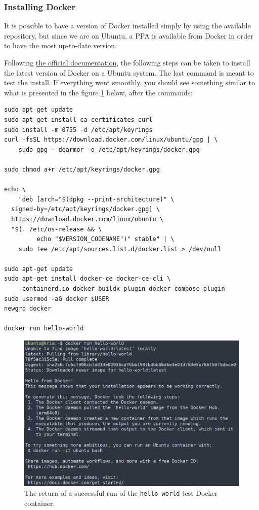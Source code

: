 \documentclass[10pt]{article}
\begin{document}
\subsubsection{Installing Docker}
\label{sec:org33d85de}
It is possible to have a version of Docker installed simply by using the available repository,
but since we are on Ubuntu, a PPA is available from Docker in order to have the most up-to-date version.

Following \href{https://docs.docker.com/engine/install/ubuntu/\#install-using-the-repository}{the official documentation}, the following steps can be taken to install the latest version of
Docker on a Ubuntu system. The last command is meant to test the install.
If everything went smoothly, you should see something similar to what is presented
in the figure \ref{fig:orgdd37b15} below, after the commands:

\begin{verbatim}
sudo apt-get update
sudo apt-get install ca-certificates curl
sudo install -m 0755 -d /etc/apt/keyrings
curl -fsSL https://download.docker.com/linux/ubuntu/gpg | \
    sudo gpg --dearmor -o /etc/apt/keyrings/docker.gpg

sudo chmod a+r /etc/apt/keyrings/docker.gpg

echo \
    "deb [arch="$(dpkg --print-architecture)" \
  signed-by=/etc/apt/keyrings/docker.gpg] \
  https://download.docker.com/linux/ubuntu \
  "$(. /etc/os-release && \
         echo "$VERSION_CODENAME")" stable" | \
    sudo tee /etc/apt/sources.list.d/docker.list > /dev/null

sudo apt-get update
sudo apt-get install docker-ce docker-ce-cli \
     containerd.io docker-buildx-plugin docker-compose-plugin
sudo usermod -aG docker $USER
newgrp docker

docker run hello-world
\end{verbatim}

\begin{figure}[htbp]
\centering
\includegraphics[width=.7\textwidth]{img/hello-docker.png}
\caption{\label{fig:orgdd37b15}The return of a successful run of the \texttt{hello world} test Docker container.}
\end{figure}
\end{document}
